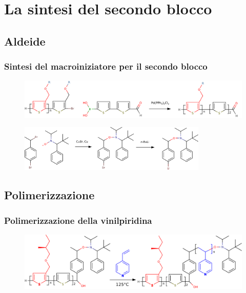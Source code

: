 \documentclass{beamer}
\begin{document}
\section{La sintesi del secondo blocco}
\subsection{Aldeide}
\begin{frame}%
\frametitle{Sintesi del macroiniziatore per il secondo blocco}
\begin{figure}\centering \includegraphics[width=1\textwidth]{img/syn-aldeide.pdf}
\end{figure}
\vfill

\begin{figure}\centering \includegraphics[width=0.8\textwidth]{img/syn-tipno-li.pdf}
\end{figure}
\end{frame}
\subsection{Polimerizzazione}
\begin{frame}%
\frametitle{Polimerizzazione della vinilpiridina}
\begin{figure}\centering \includegraphics[width=1\textwidth]{img/syn-blocco.pdf}\end{figure}
\end{frame}
\end{document}
